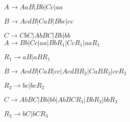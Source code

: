 \begin{question}

$A \rightarrow AaB | Bb | Cc | aa$

$B \rightarrow AcdB | CaB | Bbc | cc$ 

$C \rightarrow CbC | AbBC | Bb | bb$ \\

$A \rightarrow Bb | Cc | aa | BbR_1 | CcR_1 | aaR_1$

$R_1 \rightarrow aB | aBR_1$

$B \rightarrow AcdB | CaB | cc | AcdBR_2 | CaBR_2 | ccR_2$

$R_2 \rightarrow bc | bcR_2$ 

$C \rightarrow AbBC | Bb | bb | AbBCR_3 | BbR_3 | bbR_3$

$R_3 \rightarrow bC | bCR_3$

\end{question}